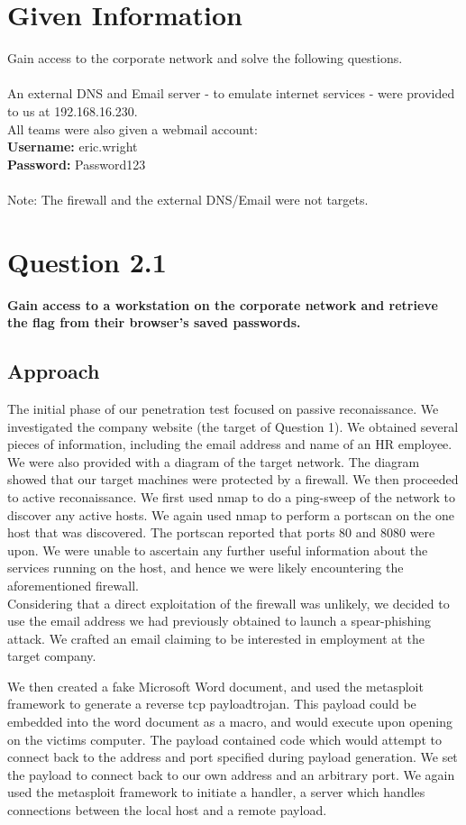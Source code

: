\section{Given Information}
Gain access to the corporate network and solve the following questions.
\\\\
An external DNS and Email server - to emulate internet services - were provided
to us at 192.168.16.230.\\
All teams were also given a webmail account:\\
\textbf{Username:} eric.wright
\\
\textbf{Password:} Password123
\\\\
Note: The firewall and the external DNS/Email were not targets.

\section{Question 2.1}
\textbf{Gain access to a workstation on the corporate network and retrieve the
flag from their browser's saved passwords.}
\subsection{Approach}
The initial phase of our penetration test focused on passive reconaissance. We investigated the company website (the target of Question 1). We obtained several pieces of information, including the email address and name of an HR employee. We were also provided with a diagram of the target network. The diagram showed that our target machines were protected by a firewall. We then proceeded to active reconaissance. We first used nmap to do a ping-sweep of the network to discover any active hosts. We again used nmap to perform a portscan on the one host that was discovered. The portscan reported that ports 80 and 8080 were upon. We were unable to ascertain any further useful information about the services running on the host, and hence we were likely encountering the aforementioned firewall.\\
Considering that a direct exploitation of the firewall was unlikely, we decided to use the email address we had previously obtained to launch a spear-phishing attack. We crafted an email claiming to be interested in employment at the target company.

We then created a fake Microsoft Word document, and used the metasploit framework to generate a reverse tcp payloadtrojan. This payload could be embedded into the word document as a macro, and would execute upon opening on the victims computer. The payload contained code which would attempt to connect back to the address and port specified during payload generation. We set the payload to connect back to our own address and an arbitrary port. We again used the metasploit framework to initiate a handler, a server which handles connections between the local host and a remote payload.

